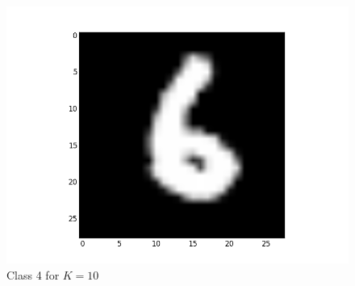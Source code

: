 \documentclass[submit]{harvardml}
\begin{document}
\begin{figure}[ht]
    \includegraphics[scale=0.20]{representative-3-2}
    \caption{Class 4 for $K=10$}
\end{figure}
\end{document}

